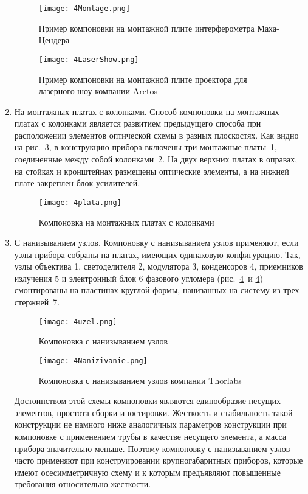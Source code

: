 \begin{enumerate}
	\begin{figure}[h!]
		\caption{ Пример компоновки на монтажной плите интерферометра Маха-Цендера }
		\texttt{[image: 4Montage.png]}
		\label{pic:4Montage}
	\end{figure}
	
	\begin{figure}[h!]
		\caption{ Пример компоновки на монтажной плите проектора для лазерного шоу компании Arctos }
		\texttt{[image: 4LaserShow.png]}
		\label{pic:4LaserShow}
	\end{figure}
	
	\item На монтажных платах с колонками. Способ компоновки на монтажных платах с колонками является развитием предыдущего способа при расположении элементов оптической схемы в разных плоскостях. Как видно на рис.~\ref{pic:4plata}, в конструкцию прибора включены три монтажные платы~1, соединенные между собой колонками~2. На двух верхних платах в оправах, на стойках и кронштейнах размещены оптические элементы, а на нижней плате закреплен блок усилителей.
	
	\begin{figure}[h!]
		\caption{Компоновка на монтажных платах с колонками}
		\texttt{[image: 4plata.png]}
		\label{pic:4plata}
	\end{figure}
	
	\item С нанизыванием узлов. Компоновку с нанизыванием узлов применяют, если узлы прибора собраны на платах, имеющих одинаковую конфигурацию. Так, узлы объектива 1, светоделителя 2, модулятора 3, конденсоров 4, приемников излучения 5 и электронный блок 6 фазового угломера (рис.~\ref{pic:4uzel}~и \ref{pic:4uzel}) смонтированы на пластинах круглой формы, нанизанных на систему из трех стержней~7.
	
	\begin{figure}[h!]
		\caption{Компоновка с нанизыванием узлов}
		\texttt{[image: 4uzel.png]}
		\label{pic:4uzel}
	\end{figure}
	
	\begin{figure}[h!]
		\caption{Компоновка с нанизыванием узлов компании Thorlabs}
		\texttt{[image: 4Nanizivanie.png]}
		\label{pic:4Nanizivanie}
	\end{figure}
	
	Достоинством этой схемы компоновки являются единообразие несущих элементов, простота сборки и юстировки. Жесткость и стабильность такой конструкции не намного ниже аналогичных параметров конструкции при компоновке с применением трубы в качестве несущего элемента, а масса прибора значительно меньше. Поэтому компоновку с нанизыванием узлов часто применяют при конструировании крупногабаритных приборов, которые имеют осесимметричную схему и к которым предъявляют повышенные требования относительно жесткости.
	

\end{enumerate}
